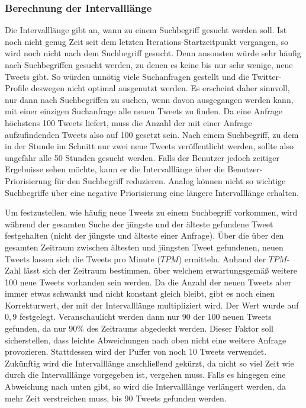 \subsubsection{Berechnung der Intervalllänge}

Die Intervalllänge gibt an, wann zu einem Suchbegriff gesucht werden soll.
Ist noch nicht genug Zeit seit dem letzten Iterations-Startzeitpunkt vergangen, so wird noch nicht nach dem Suchbegriff gesucht.
Denn ansonsten würde sehr häufig nach Suchbegriffen gesucht werden, zu denen es keine bis nur sehr wenige, neue Tweets gibt.
So würden unnötig viele Suchanfragen gestellt und die Twitter-Profile deswegen nicht optimal ausgenutzt werden.
Es erscheint daher sinnvoll, nur dann nach Suchbegriffen zu suchen, wenn davon ausgegangen werden kann, mit einer einzigen Suchanfrage alle neuen Tweets zu finden.
Da eine Anfrage höchstens 100 Tweets liefert, muss die Anzahl der mit einer Anfrage aufzufindenden Tweets also auf 100 gesetzt sein.
Nach einem Suchbegriff, zu dem in der Stunde im Schnitt nur zwei neue Tweets veröffentlicht werden, sollte also ungefähr alle 50 Stunden gesucht werden.
Falls der Benutzer jedoch zeitiger Ergebnisse sehen möchte, kann er die Intervalllänge über die Benutzer-Priorisierung für den Suchbegriff reduzieren.
Analog können nicht so wichtige Suchbegriffe über eine negative Priorisierung eine längere Intervalllänge erhalten.

Um festzustellen, wie häufig neue Tweets zu einem Suchbegriff vorkommen, wird während der gesamten Suche der jüngste und der älteste gefundene Tweet festgehalten (nicht der jüngste und älteste einer Anfrage).
Über die über den gesamten Zeitraum zwischen ältesten und jüngsten Tweet gefundenen, neuen Tweets lassen sich die Tweets pro Minute ($TPM$) ermitteln.
Anhand der $TPM$-Zahl lässt sich der Zeitraum bestimmen, über welchem erwartungsgemäß weitere 100 neue Tweets vorhanden sein werden.
Da die Anzahl der neuen Tweets aber immer etwas schwankt und nicht konstant gleich bleibt, gibt es noch einen Korrekturwert, der mit der Intervalllänge multipliziert wird.
Der Wert wurde auf $0,9$ festgelegt.
Veranschaulicht werden dann nur 90 der 100 neuen Tweets gefunden, da nur $90\%$ des Zeitraums abgedeckt werden.
Dieser Faktor soll sicherstellen, dass leichte Abweichungen nach oben nicht eine weitere Anfrage provozieren.
Stattdessen wird der Puffer von noch 10 Tweets verwendet.
Zukünftig wird die Intervalllänge anschließend gekürzt, da nicht so viel Zeit wie durch die Intervalllänge vorgegeben ist, vergehen muss.
Falls es hingegen eine Abweichung nach unten gibt, so wird die Intervalllänge verlängert werden, da mehr Zeit verstreichen muss, bis 90 Tweets gefunden werden.

